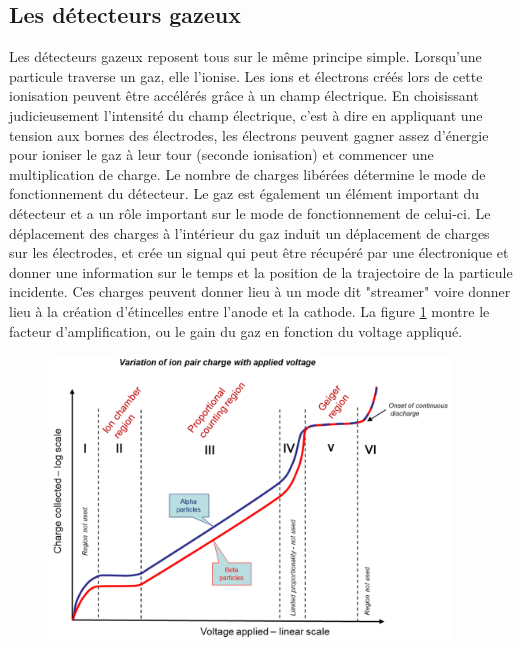 \subsection{Les détecteurs gazeux}
Les détecteurs gazeux reposent tous sur le même principe simple. Lorsqu'une particule traverse un gaz, elle l'ionise. Les ions et électrons créés lors de cette ionisation peuvent être accélérés grâce à un champ électrique. En choisissant judicieusement l'intensité du champ électrique, c'est à dire en appliquant une tension aux bornes des électrodes, les électrons peuvent gagner assez d'énergie pour ioniser le gaz à leur tour (seconde ionisation) et commencer une multiplication de charge. Le nombre de charges libérées détermine le mode de fonctionnement du détecteur. Le gaz est également un élément important du détecteur et a un rôle important sur le mode de fonctionnement de celui-ci. Le déplacement des charges à l'intérieur du gaz induit un déplacement de charges sur les électrodes, et crée un signal qui peut être récupéré par une électronique et donner une information sur le temps et la position de la trajectoire de la particule incidente. Ces charges peuvent donner lieu à un mode dit "streamer" voire donner lieu à la création d'étincelles entre l'anode et la cathode. La figure \ref{mult} montre le facteur d'amplification, ou le gain du gaz en fonction du voltage appliqué. 

\begin{figure}[h!]
	\centering
	\includegraphics[width=0.95\textwidth]{RPC/gasgain.png}
	\label{mult}
\end{figure}

